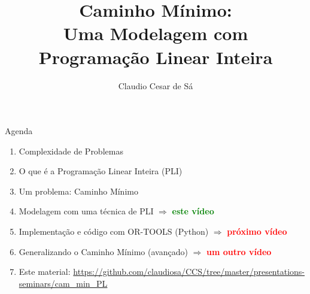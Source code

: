 \documentclass{beamer}
\title[Inteligência Artificial -- Otimização Combinatória] %
{Caminho Mínimo: \\ Uma Modelagem com\\ Programação Linear Inteira}
\author[Claudio Cesar de Sá] %
{Claudio Cesar de Sá\inst{1}}
\institute[UDESC]{Pesquisador Independente}
\date[\today] %
\begin{document}
\begin{frame}
  \titlepage
\end{frame}








\begin{frame}

\begin{block}{Agenda}

\begin{enumerate}

  \item  Complexidade de Problemas
  \item O que é a Programação Linear Inteira (PLI)
  \item  Um problema: Caminho Mínimo
  \item  Modelagem com uma técnica de PLI  $\Rightarrow$ \textbf{\textcolor{green}{este vídeo}}
  \item  Implementação e código com OR-TOOLS (Python) $\Rightarrow$  \textbf{\textcolor{red}{próximo vídeo}} 
  \item  Generalizando o Caminho Mínimo (avançado) $\Rightarrow$ \textbf{\textcolor{red}{um outro vídeo}} 
  \item Este material: \url{https://github.com/claudiosa/CCS/tree/master/presentations-seminars/cam_min_PL}
  \end{enumerate}

\end{block}

\end{frame}
\end{document}
